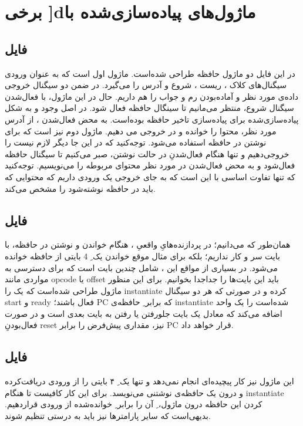 \section*{
	برخی ]dماژول‌های پیاده‌سازی‌شده با
}

\subsection*{فایل 
}
در این فایل دو ماژول حافظه طراحی شده‌است. ماژول اول
است که به عنوان ورودی سیگنال‌های کلاک
، ریست
، شروع
و آدرس
را می‌گیرد. در ضمن دو سیگنال خروجی داده‌ی مورد نظر
و آماده‌بودن رم و جواب
را هم داریم. حال در این ماژول، با فعال‌شدن سیگنال شروع، منتظر می‌مانیم تا سینگال 
حافظه فعال شود.
در اصل وجود
و 
به شکل پیاده‌سازی‌شده برای پیاده‌سازی تاخیر حافظه بوده‌است.
به محض فعال‌شدن
،
از آدرس مورد نظر، محتوا را خوانده و در 
خروجی می
دهیم.
ماژول دوم نیز
است که برای نوشتن در حافظه استفاده می‌شود.
توجه‌کنید که در این جا دیگر لازم نیست
را خروجی‌دهیم و تنها هنگام
فعال‌شدنِ
در حالت نوشتن، صبر می‌کنیم تا سیگنال
حافظه فعال‌شود و به محض فعال‌شدن در
مورد نظر محتوای مربوطه را می‌نویسیم. توجه‌کنید که تنها تفاوت اساسی با
این است که به جای خروجی
یک ورودی
داریم که محتوایی که باید در حافظه نوشته‌شود را مشخص می‌کند.
\subsection*{
	فایل
}
همان‌طور که می‌دانیم؛ در پردازنده‌هایِ واقعیِ
،
هنگام خواندن و نوشتن در حافظه، با بایت سر و کار نداریم؛ بلکه برای مثال موقع خواندن یک
ِ
4	 بایتی از حافظه خوانده می‌شود. در بسیاری از مواقع این
،
شامل چندین بایت است که برای دسترسی به مواردی مانند opcode یا offset باید این بایت‌ها را جداجدا بخوانیم. برای این منظور ماژول
طراحی شده‌است که یک
را instantiate کرده و در صورتی که هر دو سیگنال start و ready فعال باشند؛ PC که برابر
ِ
حافظه‌ی instantiate شده‌است را یک واحد اضافه می‌کند که معادل یک بایت جلورفتن یا رفتن به بایت بعدی است و در صورت فعال‌بودنِ reset نیز، مقداری پیش‌فرض را برابر PC قرار خواهد داد.
\subsection*{فایل
	}
این ماژول نیز کار پیچیده‌ای انجام نمی‌دهد و تنها یک
ِ
۴ بایتی را از ورودی دریافت‌کرده و درون یک حافظه‌ی نوشتنی
می‌نویسد. برای این کار کافیست تا هنگام instantiate کردن این حافظه درون ماژول،
ِ
آن را برابر 
ِ
خوانده‌شده از ورودی قراردهیم. بدیهی‌است که سایر پارامترها نیز باید به درستی تنظیم شوند.
